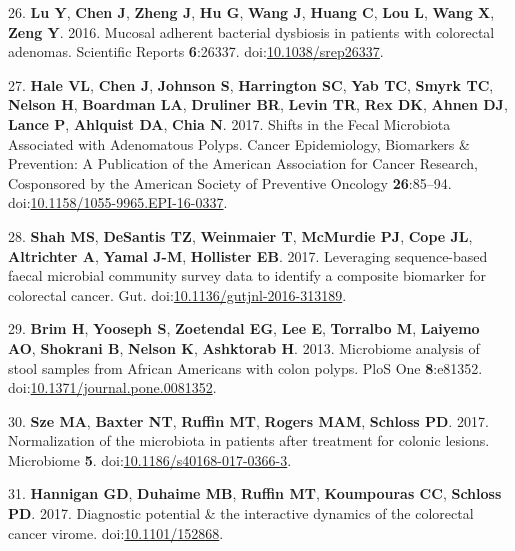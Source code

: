 \documentclass[12pt,]{article}
\begin{document}
\hypertarget{ref-lu_mucosal_2016}{}
26. \textbf{Lu Y}, \textbf{Chen J}, \textbf{Zheng J}, \textbf{Hu G},
\textbf{Wang J}, \textbf{Huang C}, \textbf{Lou L}, \textbf{Wang X},
\textbf{Zeng Y}. 2016. Mucosal adherent bacterial dysbiosis in patients
with colorectal adenomas. Scientific Reports \textbf{6}:26337.
doi:\href{https://doi.org/10.1038/srep26337}{10.1038/srep26337}.

\hypertarget{ref-hale_shifts_2017}{}
27. \textbf{Hale VL}, \textbf{Chen J}, \textbf{Johnson S},
\textbf{Harrington SC}, \textbf{Yab TC}, \textbf{Smyrk TC},
\textbf{Nelson H}, \textbf{Boardman LA}, \textbf{Druliner BR},
\textbf{Levin TR}, \textbf{Rex DK}, \textbf{Ahnen DJ}, \textbf{Lance P},
\textbf{Ahlquist DA}, \textbf{Chia N}. 2017. Shifts in the Fecal
Microbiota Associated with Adenomatous Polyps. Cancer Epidemiology,
Biomarkers \& Prevention: A Publication of the American Association for
Cancer Research, Cosponsored by the American Society of Preventive
Oncology \textbf{26}:85--94.
doi:\href{https://doi.org/10.1158/1055-9965.EPI-16-0337}{10.1158/1055-9965.EPI-16-0337}.

\hypertarget{ref-shah_leveraging_2017}{}
28. \textbf{Shah MS}, \textbf{DeSantis TZ}, \textbf{Weinmaier T},
\textbf{McMurdie PJ}, \textbf{Cope JL}, \textbf{Altrichter A},
\textbf{Yamal J-M}, \textbf{Hollister EB}. 2017. Leveraging
sequence-based faecal microbial community survey data to identify a
composite biomarker for colorectal cancer. Gut.
doi:\href{https://doi.org/10.1136/gutjnl-2016-313189}{10.1136/gutjnl-2016-313189}.

\hypertarget{ref-brim_microbiome_2013}{}
29. \textbf{Brim H}, \textbf{Yooseph S}, \textbf{Zoetendal EG},
\textbf{Lee E}, \textbf{Torralbo M}, \textbf{Laiyemo AO},
\textbf{Shokrani B}, \textbf{Nelson K}, \textbf{Ashktorab H}. 2013.
Microbiome analysis of stool samples from African Americans with colon
polyps. PloS One \textbf{8}:e81352.
doi:\href{https://doi.org/10.1371/journal.pone.0081352}{10.1371/journal.pone.0081352}.

\hypertarget{ref-Sze2017}{}
30. \textbf{Sze MA}, \textbf{Baxter NT}, \textbf{Ruffin MT},
\textbf{Rogers MAM}, \textbf{Schloss PD}. 2017. Normalization of the
microbiota in patients after treatment for colonic lesions. Microbiome
\textbf{5}.
doi:\href{https://doi.org/10.1186/s40168-017-0366-3}{10.1186/s40168-017-0366-3}.

\hypertarget{ref-Hannigan2017}{}
31. \textbf{Hannigan GD}, \textbf{Duhaime MB}, \textbf{Ruffin MT},
\textbf{Koumpouras CC}, \textbf{Schloss PD}. 2017. Diagnostic potential
\& the interactive dynamics of the colorectal cancer virome.
doi:\href{https://doi.org/10.1101/152868}{10.1101/152868}.
\end{document}
